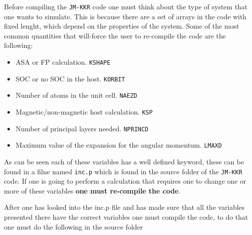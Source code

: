 \documentclass[11pt,fleqn]{book} %
\begin{document}
Before compiling the \verb;JM-KKR; code one must think about the type of system that one wants to simulate. This is because there are a set of arrays in the code with fixed lenght, which depend on the properties of the system. Some of the most common quantities that will-force the user to re-compile the code are the following:
\begin{itemize}
\item ASA or FP calculation. \verb;KSHAPE;
\item SOC or no SOC in the host. \verb;KORBIT;
\item Number of atoms in the unit cell. \verb;NAEZD;
\item Magnetic/non-magnetic host calculation. \verb;KSP;
\item Number of principal layers needed. \verb;NPRINCD;
\item Maximum value of the expansion for the angular momentum. \verb;LMAXD;
\end{itemize} 

As can be seen each of these variables has a well defined keyword, these can be found in a filne named \verb;inc.p; which is found in the source folder of the \verb;JM-KKR; code. If one is going to perform a calculation that requires one to change one or more of these variables \textbf{one must re-compile the code}. 

After one has looked into the inc.p file and has made sure that all the variables presented there have the correct variables one must compile the code, to do that one must do the following in the source folder
\end{document}
